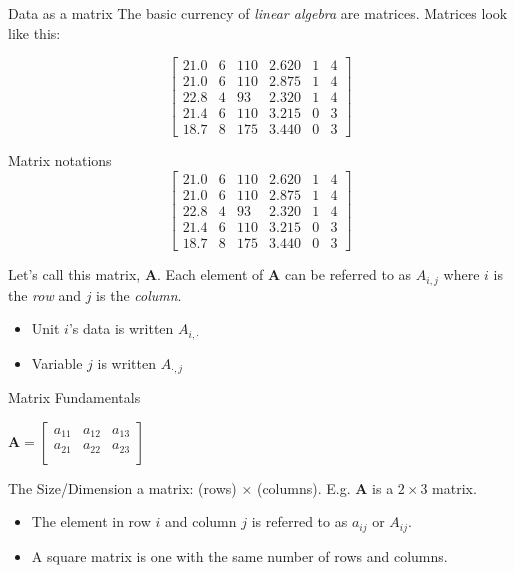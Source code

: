 \documentclass[aspectratio=169,t,11pt,table]{beamer}
\begin{document}
\begin{frame}{Data as a matrix}
  The basic currency of \emph{linear algebra} are \alert{matrices}. Matrices look like this:
  
  $$
    \begin{bmatrix}
      21.0 & 6 & 110 & 2.620 & 1 & 4\\
      21.0 & 6 & 110 & 2.875 & 1 & 4\\
      22.8 & 4 &  93 & 2.320 & 1 & 4\\
      21.4 & 6 & 110 & 3.215 & 0 & 3\\
      18.7 & 8 & 175 & 3.440 & 0 & 3
    \end{bmatrix}
  $$ 
\end{frame}

\begin{frame}{Matrix notations}
  \vspace*{-\bigskipamount}
  $$
    \begin{bmatrix}
      21.0 & 6 & 110 & 2.620 & 1 & 4\\
      21.0 & 6 & 110 & 2.875 & 1 & 4\\
      22.8 & 4 &  93 & 2.320 & 1 & 4\\
      21.4 & 6 & 110 & 3.215 & 0 & 3\\
      18.7 & 8 & 175 & 3.440 & 0 & 3
    \end{bmatrix}
  $$ 

  \medskip
  Let's call this matrix, $\bm{A}$. Each element of $\bm{A}$ can be referred to as $A_{i,j}$ where $i$ is the \emph{row} and $j$ is the \emph{column}.
  \pause
  \begin{itemize}
    \item Unit $i$'s data is written $A_{i,\cdot}$
    \item Variable $j$ is written $A_{\cdot, j}$
  \end{itemize}
\end{frame}

\begin{frame}{Matrix Fundamentals}
  \begin{center}
    $\bm{A} = \begin{bmatrix}
        a_{11} & a_{12} & a_{13} \\
        a_{21} & a_{22} & a_{23} \\
      \end{bmatrix}$
  \end{center}

  The \alert{Size}/\alert{Dimension} a matrix: (rows) $\times$ (columns). E.g. $\bm{A}$ is a $2 \times 3$ matrix.
  \begin{itemize}
    \item The element in row $i$ and column $j$ is referred to as $a_{ij}$ or $A_{ij}$.
    
    \item A \alert{square matrix} is one with the same number of rows and columns. 
  \end{itemize}
\end{frame}
\end{document}
